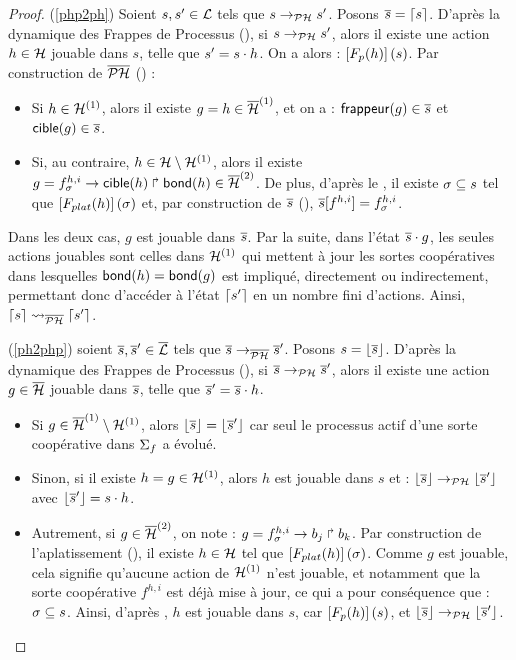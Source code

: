 \begin{proof}
  (\ref{php2ph}) Soient $s, s' \in \mathcal{L}$ tels que $s \rightarrow_{\mathcal{PH}} s'$.
    Posons $\overline{s} = \lceil s \rceil$.
    D'après la dynamique des Frappes de Processus (),
    si $s \rightarrow_{\mathcal{PH}} s'$, alors il existe une action $h \in \mathcal{H}$ jouable dans $s$,
    telle que $s' = s \cdot h$.
    On a alors : $\left[F_{p}(h)\right](s)$.
    Par construction de $\overline{\mathcal{PH}}$ () :
    \begin{itemize}
      \item Si $h \in \mathcal{H}^{(1)}$, alors il existe $g = h \in \overline{\mathcal{H}}^{(1)}$,
        et on a : $\mathsf{frappeur}(g) \in \overline{s}$ et $\mathsf{cible}(g) \in \overline{s}$.
      \item Si, au contraire, $h \in \mathcal{H} \setminus \mathcal{H}^{(1)}$, alors il existe
        $g = f^{h,i}_\sigma\rightarrow\mathsf{cible}(h)\Rsh\mathsf{bond}(h) \in \overline{\mathcal{H}}^{(2)}$.
        De plus, d'après le , il existe $\sigma \subseteq s$
        tel que $\left[F_{plat}(h)\right](\sigma)$
        et, par construction de $\overline{s}$ (),
        ${\overline{s}[f^{h,i}]} = f^{h,i}_\sigma$.
    \end{itemize}
    Dans les deux cas, $g$ est jouable dans $\overline{s}$.
    Par la suite, dans l'état $\overline{s} \cdot g$, les seules actions jouables sont celles dans
    $\mathcal{H}^{(1)}$ qui mettent à jour les sortes coopératives dans lesquelles
    $\mathsf{bond}(h) = \mathsf{bond}(g)$ est impliqué, directement ou indirectement,
    permettant donc d'accéder à l'état $\lceil s' \rceil$ en un nombre fini d'actions.
    Ainsi, $\lceil s \rceil \rightsquigarrow_{\overline{\mathcal{PH}}} \lceil s' \rceil$.
  
  (\ref{ph2php}) soient $\overline{s}, \overline{s}' \in \overline{\mathcal{L}}$ tels que $\overline{s} \rightarrow_{\overline{\mathcal{PH}}} \overline{s}'$.
    Posons $s = \lfloor \overline{s} \rfloor$.
    D'après la dynamique des Frappes de Processus (),
    si $\overline{s} \rightarrow_{\mathcal{PH}} \overline{s}'$, alors il existe une action $g \in \overline{\mathcal{H}}$ jouable dans $\overline{s}$,
    telle que $\overline{s}' = \overline{s} \cdot h$.
    \begin{itemize}
      \item Si $g \in \overline{\mathcal{H}}^{(1)} \setminus \mathcal{H}^{(1)}$,
        alors $\lfloor \overline{s} \rfloor = \lfloor \overline{s}' \rfloor$ car seul le processus actif d'une sorte
        coopérative dans $\Sigma_f$ a évolué. %
      \item Sinon, si il existe $h = g \in \mathcal{H}^{(1)}$,
        alors $h$ est jouable dans $s$ et : $\lfloor \overline{s} \rfloor \rightarrow_{\mathcal{PH}} \lfloor \overline{s}' \rfloor$
        avec $\lfloor \overline{s}' \rfloor = s \cdot h$.
      \item Autrement, si $g \in \overline{\mathcal{H}}^{(2)}$,
        on note : $g = f^{h,i}_\sigma\rightarrow b_j\Rsh b_k$.
        Par construction de l'aplatissement (), il existe
        $h \in \mathcal{H}$ tel que $\left[F_{plat}(h)\right](\sigma)$.
        Comme $g$ est jouable, cela signifie qu'aucune action de $\mathcal{H}^{(1)}$ n'est jouable,
        et notamment que la sorte coopérative $f^{h,i}$ est déjà mise à jour,
        ce qui a pour conséquence que : $\sigma \subseteq s$.
        Ainsi, d'après , $h$ est jouable dans $s$,
        car $\left[F_{p}(h)\right](s)$, et $\lfloor \overline{s} \rfloor \rightarrow_{\mathcal{PH}} \lfloor \overline{s}' \rfloor$.
    \end{itemize}
\end{proof}

